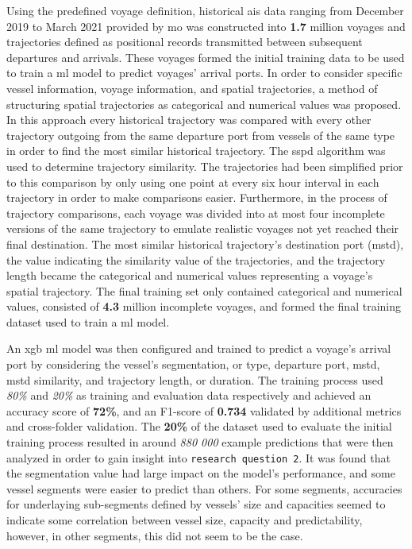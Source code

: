 Using the predefined voyage definition, historical \acrshort{ais} data ranging from December 2019 to March 2021 provided by \acrshort{mo} was constructed into \textbf{1.7} million voyages and trajectories defined as positional records transmitted between subsequent departures and arrivals. These voyages formed the initial training data to be used to train a \acrfull{ml} model to predict voyages' arrival ports. In order to consider specific vessel information, voyage information, and spatial trajectories, a method of structuring spatial trajectories as categorical and numerical values was proposed. In this approach every historical trajectory was compared with every other trajectory outgoing from the same departure port from vessels of the same type in order to find the most similar historical trajectory. The \acrfull{sspd} algorithm was used to determine trajectory similarity. The trajectories had been simplified prior to this comparison by only using one point at every six hour interval in each trajectory in order to make comparisons easier. Furthermore, in the process of trajectory comparisons, each voyage was divided into at most four incomplete versions of the same trajectory to emulate realistic voyages not yet reached their final destination. The most similar historical trajectory's destination port (\acrshort{mstd}), the value indicating the similarity value of the trajectories, and the trajectory length became the categorical and numerical values representing a voyage's spatial trajectory. The final training set only contained categorical and numerical values, consisted of \textbf{4.3} million incomplete voyages, and formed the final training dataset used to train a \acrshort{ml} model.

An \acrfull{xgb} \acrshort{ml} model was then configured and trained to predict a voyage's arrival port by considering the vessel's segmentation, or type, departure port, \acrshort{mstd}, \acrshort{mstd} similarity, and trajectory length, or duration. The training process used \textit{80\%} and \textit{20\%} as training and evaluation data respectively and achieved an accuracy score of \textbf{72\%}, and an F1-score of \textbf{0.734} validated by additional metrics and cross-folder validation. The \textbf{20\%} of the dataset used to evaluate the initial training process resulted in around \textit{880 000} example predictions that were then analyzed in order to gain insight into \texttt{research question 2}. It was found that the segmentation value had large impact on the model's performance, and some vessel segments were easier to predict than others. For some segments, accuracies for underlaying sub-segments defined by vessels' size and capacities seemed to indicate some correlation between vessel size, capacity and predictability, however, in other segments, this did not seem to be the case.

